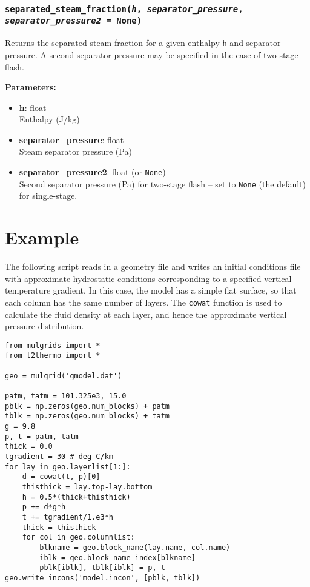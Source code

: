 \begin{snugshade}
\subsubsection{\texttt{separated\_steam\_fraction(\emph{h}, \emph{separator\_pressure}, \emph{separator\_pressure2} = None)}}
\end{snugshade}
\label{sec:t2thermo:separated_steam_fraction}

Returns the separated steam fraction for a given enthalpy \texttt{h} and separator pressure.  A second separator pressure may be specified in the case of two-stage flash.

\textbf{Parameters:}
\begin{itemize}
\item \textbf{h}: float\\
  Enthalpy (J/kg)
\item \textbf{separator\_pressure}: float\\
  Steam separator pressure (Pa)
\item \textbf{separator\_pressure2}: float (or \texttt{None})\\
  Second separator pressure (Pa) for two-stage flash -- set to \texttt{None} (the default) for single-stage.
\end{itemize}

\section{Example}

The following script reads in a geometry file and writes an initial conditions file with approximate hydrostatic conditions corresponding to a specified vertical temperature gradient.  In this case, the model has a simple flat surface, so that each column has the same number of layers.  The \texttt{cowat} function is used to calculate the fluid density at each layer, and hence the approximate vertical pressure distribution.

\begin{lstlisting}
from mulgrids import *
from t2thermo import *

geo = mulgrid('gmodel.dat')

patm, tatm = 101.325e3, 15.0
pblk = np.zeros(geo.num_blocks) + patm
tblk = np.zeros(geo.num_blocks) + tatm
g = 9.8
p, t = patm, tatm
thick = 0.0
tgradient = 30 # deg C/km
for lay in geo.layerlist[1:]:
    d = cowat(t, p)[0]
    thisthick = lay.top-lay.bottom
    h = 0.5*(thick+thisthick)
    p += d*g*h
    t += tgradient/1.e3*h
    thick = thisthick
    for col in geo.columnlist:
        blkname = geo.block_name(lay.name, col.name)
        iblk = geo.block_name_index[blkname]
        pblk[iblk], tblk[iblk] = p, t
geo.write_incons('model.incon', [pblk, tblk])
\end{lstlisting}
